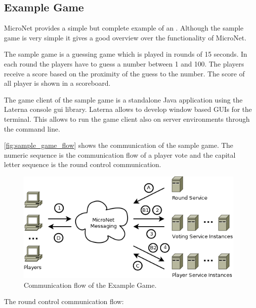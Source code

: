\subsection{Example Game}

MicroNet provides a simple but complete example of an \og{}. Although the sample
game is very simple it gives a good overview over the functionality of MicroNet.

The sample game is a guessing game which is played in rounds of 15 seconds.
In each round the players have to guess a number between 1 and 100. The players
receive a score based on the proximity of the guess to the number. The score of
all player is shown in a scoreboard. 

The game client of the sample game is a standalone Java application using the
Laterna console gui library. Laterna allows to develop window based GUIs for the
terminal. This allows to run the game client also on server environments
through the command line. 

\autoref{fig:sample_game_flow} shows the communication of the sample game. The
numeric sequence is the communication flow of a player vote and the capital
letter sequence is the round control communication.\\

\begin{figure}
	\centering
	\includegraphics[width=\textwidth]{images/architecture/SampleGame}
	\caption{Communication flow of the Example Game.}
	\label{fig:sample_game_flow}
\end{figure}

The round control communication flow:

